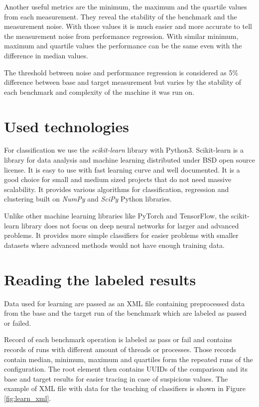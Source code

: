 Another useful metrics are the minimum, the maximum and the quartile values from each
measurement. They reveal the stability of the benchmark and the measurement
noise. With those values it is much easier and more accurate to tell the
measurement noise from performance regression. With similar minimum, maximum and
quartile values the performance can be the same even with the difference in median values.

The threshold between noise and performance regression is considered as 5\%
difference between base and target measurement but varies by the stability of
each benchmark and complexity of the machine it was run on.

\section{Used technologies}
For classification we use the \emph{scikit-learn} library\;\cite{scikit-learn} with
Python3. Scikit-learn is a library for data analysis and machine learning
distributed under BSD open source license. It is easy to use with fast learning curve and
well documented. It is a good choice for small and medium sized projects that do
not need massive scalability. It provides various algorithms for classification,
regression and clustering built on \emph{NumPy} and \emph{SciPy} Python
libraries.

Unlike other machine learning libraries like PyTorch and TensorFlow, the
scikit-learn library does not focus on deep neural networks for larger and
advanced problems. It provides more simple classifiers for easier problems
with smaller datasets where advanced methods would not have enough training
data.

\section{Reading the labeled results} \label{sec:learn_xml}
Data used for learning are passed as an XML file containing preprocessed data from
the base and the target run of the benchmark which are labeled as passed or failed.

Record of each benchmark operation is labeled as pass or fail and contains
records of runs with different amount of threads or processes. Those records
contain median, minimum, maximum and quartiles form the repeated runs of the
configuration. The root element then contains UUIDs of the comparison and its base
and target results for easier tracing in case of suspicious values.
The example of XML file with data for the teaching of classifiers is shown in Figure
\ref{fig:learn_xml}.

